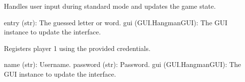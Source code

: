 \documentclass[letterpaper,10pt,english]{sphinxmanual}
\begin{document}
\begin{fulllineitems}
\label{\detokenize{modules:Game_Logic.on_submit}}
\pysigstartsignatures
{}
\pysigstopsignatures
\sphinxAtStartPar
Handles user input during standard mode and updates the game state.
\begin{description}
\sphinxAtStartPar
entry (str): The guessed letter or word.
gui (GUI.HangmanGUI): The GUI instance to update the interface.

\end{description}

\end{fulllineitems}


\begin{fulllineitems}
\label{\detokenize{modules:Game_Logic.register_player1}}
\pysigstartsignatures
{}
\pysigstopsignatures
\sphinxAtStartPar
Registers player 1 using the provided credentials.
\begin{description}
\sphinxAtStartPar
name (str): Username.
password (str): Password.
gui (GUI.HangmanGUI): The GUI instance to update the interface.

\end{description}

\end{fulllineitems}

\end{document}

